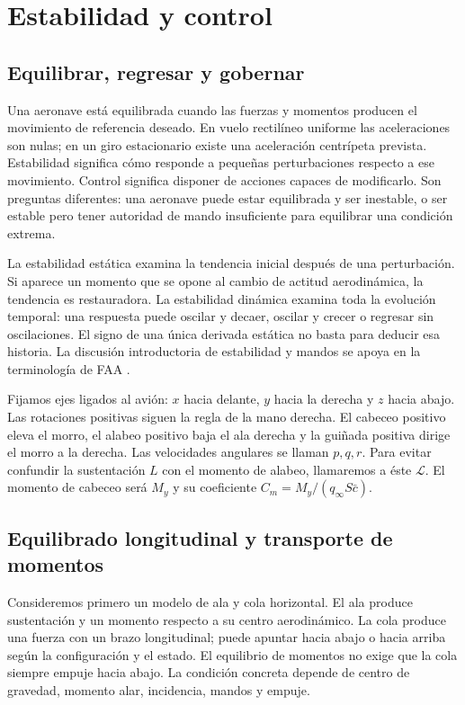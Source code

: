 \chapter{Estabilidad y control}\label{ch:12}

\section{Equilibrar, regresar y gobernar}
Una aeronave está equilibrada cuando las fuerzas y momentos producen el movimiento de referencia deseado. En vuelo rectilíneo uniforme las aceleraciones son nulas; en un giro estacionario existe una aceleración centrípeta prevista. Estabilidad significa cómo responde a pequeñas perturbaciones respecto a ese movimiento. Control significa disponer de acciones capaces de modificarlo. Son preguntas diferentes: una aeronave puede estar equilibrada y ser inestable, o ser estable pero tener autoridad de mando insuficiente para equilibrar una condición extrema.

La estabilidad estática examina la tendencia inicial después de una perturbación. Si aparece un momento que se opone al cambio de actitud aerodinámica, la tendencia es restauradora. La estabilidad dinámica examina toda la evolución temporal: una respuesta puede oscilar y decaer, oscilar y crecer o regresar sin oscilaciones. El signo de una única derivada estática no basta para deducir esa historia. La discusión introductoria de estabilidad y mandos se apoya en la terminología de FAA \cite{PHAK}.

Fijamos ejes ligados al avión: $x$ hacia delante, $y$ hacia la derecha y $z$ hacia abajo. Las rotaciones positivas siguen la regla de la mano derecha. El cabeceo positivo eleva el morro, el alabeo positivo baja el ala derecha y la guiñada positiva dirige el morro a la derecha. Las velocidades angulares se llaman $p,q,r$. Para evitar confundir la sustentación $L$ con el momento de alabeo, llamaremos a éste $\mathcal L$. El momento de cabeceo será $M_y$ y su coeficiente $C_m=M_y/(q_\infty S\bar c)$.

\section{Equilibrado longitudinal y transporte de momentos}
Consideremos primero un modelo de ala y cola horizontal. El ala produce sustentación y un momento respecto a su centro aerodinámico. La cola produce una fuerza con un brazo longitudinal; puede apuntar hacia abajo o hacia arriba según la configuración y el estado. El equilibrio de momentos no exige que la cola siempre empuje hacia abajo. La condición concreta depende de centro de gravedad, momento alar, incidencia, mandos y empuje.


